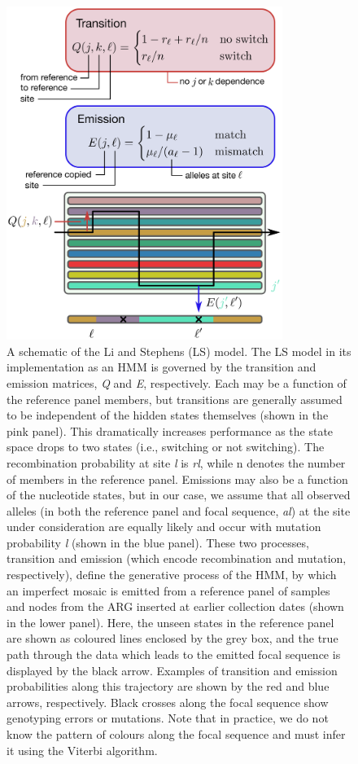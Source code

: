 \documentclass{article}
\begin{document}
\begin{figure} \centering
\includegraphics[width=0.8\textwidth]{figures/ls_diagram_covid.pdf}
\caption{\label{fig:ls_diagram} A schematic of the Li and Stephens (LS) model.
The LS model in its implementation as an HMM is governed by the transition and
emission matrices, \textit{Q} and \textit{E}, respectively. Each may be a
function of the reference panel members, but transitions are generally assumed
to be independent of the hidden states themselves (shown in the pink panel).
This dramatically increases performance as the state space drops to two states
(i.e., switching or not switching). The recombination probability at site
\textit{l} is \textit{rl}, while n denotes the number of members in the
reference panel. Emissions may also be a function of the nucleotide states, but
in our case, we assume that all observed alleles (in both the reference panel
and focal sequence, \textit{al}) at the site under consideration are equally
likely and occur with mutation probability \textit{l} (shown in the blue
panel). These two processes, transition and emission (which encode
recombination and mutation, respectively), define the generative process of the
HMM, by which an imperfect mosaic is emitted from a reference panel of samples
and nodes from the ARG inserted at earlier collection dates (shown in the lower
panel). Here, the unseen states in the reference panel are shown as coloured
lines enclosed by the grey box, and the true path through the data which leads
to the emitted focal sequence is displayed by the black arrow. Examples of
transition and emission probabilities along this trajectory are shown by the
red and blue arrows, respectively. Black crosses along the focal sequence show
genotyping errors or mutations. Note that in practice, we do not know the
pattern of colours along the focal sequence and must infer it using the Viterbi
algorithm.} \end{figure}
\end{document}

